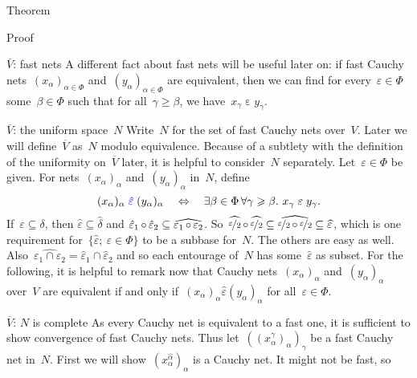 \documentclass[b]{subfiles}
\begin{document}
\begin{parsec}
\begin{point}{Theorem}
\begin{point}{Proof}
\begin{point}{$\overline{V}$: fast nets}
A different fact about fast nets will be useful later on:
if fast Cauchy nets~$(x_\alpha)_{\alpha \in \Phi}$
    and~$(y_\alpha)_{\alpha \in \Phi}$ are equivalent,
    then we can find for every~$\varepsilon \in \Phi$
    some~$\beta \in \Phi$
    such that for all~$\gamma \geq \beta$,
    we have~$x_\gamma \mathrel{\varepsilon} y_\gamma$.
\end{point}
\begin{point}{$\overline{V}$: the uniform space~$N$}%
Write~$N$ for the set of fast Cauchy nets over~$V$.
Later we will define~$\overline{V}$ as~$N$ modulo equivalence.
Because of a subtlety with the definition of the uniformity
    on~$\overline{V}$ later,
    it is helpful to consider~$N$ separately.
Let~$\varepsilon \in \Phi$ be given.
For nets~$(x_\alpha)_{\alpha}$
    and~$(y_\alpha)_{\alpha}$ in~$N$,
    define
    \begin{equation*}
        (x_\alpha)_\alpha \mathrel{\Define{\hat\varepsilon}\index{epsi@$\hat\varepsilon$}}
            (y_\alpha)_\alpha
            \quad\Leftrightarrow\quad
        \exists \beta \in \Phi \, \forall \gamma \geq \beta. \ 
        x_\gamma \mathrel{\varepsilon} y_\gamma.
    \end{equation*}
If~$\varepsilon \subseteq \delta$,
then $\hat\varepsilon \subseteq \hat\delta$
and
$\hat\varepsilon_1 \mathop{\circ} \hat\varepsilon_2 
\subseteq\widehat{\varepsilon_1 \mathop{\circ} \varepsilon_2}$.
So~$
\widehat{\nicefrac{\varepsilon}{2}} \mathop{\circ}
\widehat{\nicefrac{\varepsilon}{2}} \subseteq
\widehat{\nicefrac{\varepsilon}{2} \mathop{\circ}
\nicefrac{\varepsilon}{2}} \subseteq \widehat{\varepsilon}$,
which is one requirement for~$\{ \hat\varepsilon; \ \varepsilon \in \Phi\}$
to be a subbase for~$N$.
The others are easy as well. 
Also~$\widehat{\varepsilon_1 \cap \varepsilon_2} = \hat{\varepsilon}_1
    \cap \hat{\varepsilon}_2$
    and so each entourage of~$N$ has some~$\hat\varepsilon$ as subset.
For the following,
    it is helpful to remark now
    that Cauchy nets~$(x_\alpha)_\alpha$ and~$(y_\alpha)_\alpha$ over~$V$
    are equivalent if and only if~$(x_\alpha)_\alpha \mathrel{\hat\varepsilon}
    (y_\alpha)_\alpha$ for all~$\varepsilon \in \Phi$.
\end{point}
\begin{point}{$\overline{V}$: $N$ is complete}%
As every Cauchy net is equivalent to a fast one,
it is sufficient to show convergence of fast Cauchy nets.
Thus let~$((x^\gamma_\alpha)_\alpha)_\gamma$
    be a fast Cauchy net in~$N$.
First we will show~$(x^{\hat\alpha}_\alpha)_\alpha$
    is a Cauchy net.
It might not be fast, so

\end{point}
\end{point}
\end{point}
\end{parsec}
\end{document}
